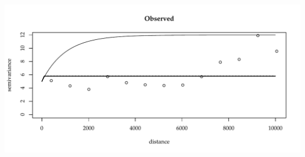 \documentclass{article}\usepackage[]{graphicx}\usepackage[]{color}
\makeatletter
\def\maxwidth{ %
  \ifdim\Gin@nat@width>\linewidth
    \linewidth
  \else
    \Gin@nat@width
  \fi
}
\newenvironment{knitrout}{}{} %
\makeatother
\begin{document}
\begin{knitrout}
{\centering \includegraphics[width=\maxwidth]{figure/sims_se-13} 

}



\end{knitrout}
\end{document}
